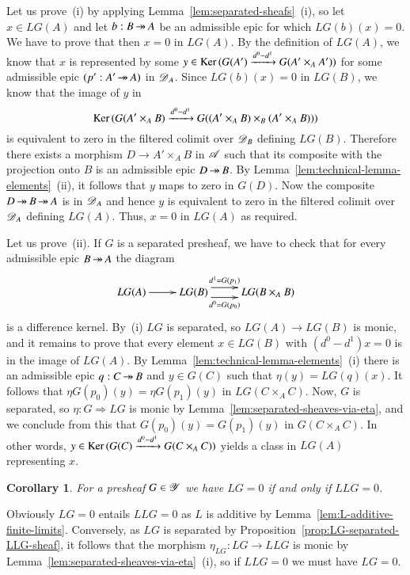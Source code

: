 \documentclass[1p]{elsarticle}
\makeatletter
\renewenvironment{proof}[1][\proofname]{\par
  \pushQED{\qed}%
  \normalfont \topsep6\p@\@plus6\p@\relax
  \trivlist
  \item[\hskip\labelsep
        \scshape
    #1\@addpunct{.}]\ignorespaces
}{%
  \popQED\endtrivlist\@endpefalse
}
\theoremstyle{mythm}
\newtheorem{Cor}[Thm]{Corollary}
\theoremstyle{mydef}
\makeatother
\begin{document}
\begin{proof}
  Let us prove~(i) by applying
  Lemma~\ref{lem:separated-sheafs}~(i), so
  let $x \in LG(A)$ and let $b:B \operatorname{\twoheadrightarrow} A$ be an admissible
  epic for which $LG(b)(x) = 0$. We have to prove that then $x = 0$
  in $LG(A)$. By the definition of $LG(A)$, we know that $x$ is
  represented by some
  $y \in \operatorname{Ker}{(G(A') \xrightarrow{d^{0} - d^{1}} G(A'\times_{A} A'))}$ 
  for some admissible epic $(p':A' \operatorname{\twoheadrightarrow} A)$ in $\operatorname{\mathscr{D}}_{A}$.
  Since $LG(b)(x) = 0$ in $LG(B)$, we know that the image of $y$ 
  in 
  \[
  \operatorname{Ker}{(G(A' \times_{A} B) \xrightarrow{d^{0} - d^{1}} G((A'
    \times_{A} B) \times_{B} (A' \times_{A} B)))}
  \]
  is equivalent to zero in the filtered colimit over $\operatorname{\mathscr{D}}_{B}$
  defining $LG(B)$. Therefore there exists a morphism 
  $D \to A' \times_{A} B$ in $\operatorname{\mathscr{A}}$ such that its composite with the
  projection onto $B$ is an admissible epic $D \operatorname{\twoheadrightarrow} B$. By
  Lemma~\ref{lem:technical-lemma-elements}~(ii), it follows that $y$
  maps to zero in $G(D)$. Now the composite $D \operatorname{\twoheadrightarrow} B \operatorname{\twoheadrightarrow} A$ is in
  $\operatorname{\mathscr{D}}_{A}$ and hence $y$ is equivalent to zero in the filtered colimit
  over $\operatorname{\mathscr{D}}_{A}$ defining $LG(A)$. Thus, $x = 0$ in $LG(A)$ as
  required.

  Let us prove~(ii). 
  If $G$ is a separated presheaf, we have to check
  that for every admissible epic $B \operatorname{\twoheadrightarrow} A$ the diagram
  \[
  \xymatrix{
    LG(A) \ar[r] &
    LG(B) \ar@<-1ex>[r]_>>>>>{d^{0} = G(p_{0})}
        \ar@<1ex>[r]^>>>>>{d^{1} = G(p_{1})} &
    LG(B \times_{A} B)
  }
  \]
  is a difference kernel. By~(i) $LG$ is separated, so
  $LG(A) \to LG(B)$ is monic, and it remains to prove that
  every element $x \in LG(B)$ with $(d^{0} - d^{1})x = 0$ is in the
  image of $LG(A)$. By Lemma~\ref{lem:technical-lemma-elements}~(i)
  there is an admissible epic $q:C \operatorname{\twoheadrightarrow} B$ and $y \in G(C)$ such
  that $\eta(y) = LG(q)(x)$. It follows that
  $\eta G(p_{0}) (y) = \eta G(p_{1})(y)$ in $LG(C \times_{A} C)$. Now,
  $G$ is separated, so $\eta: G \Rightarrow LG$ is
  monic by Lemma~\ref{lem:separated-sheaves-via-eta},
  and we conclude from this that
  $G(p_{0})(y) = G(p_{1})(y)$ in $G(C \times_{A} C)$. In
  other words,
  $y \in \operatorname{Ker}{(G(C) \xrightarrow{d^{0} - d^{1}} G(C \times_{A} C))}$
  yields a class in $LG(A)$ representing $x$.
\end{proof}

\begin{Cor}
  \label{cor:LG=0-iff-LLG=0}
  For a presheaf $G \in \operatorname{\mathscr{Y}}$ we have $LG = 0$ if and only if
  $LLG = 0$.
\end{Cor}
\begin{proof}
  Obviously $LG = 0$ entails $LLG = 0$ as $L$ is additive by 
  Lemma~\ref{lem:L-additive-finite-limits}. Conversely,
  as $LG$ is separated by
  Proposition~\ref{prop:LG-separated-LLG-sheaf}, it follows that
  the morphism $\eta_{LG}: LG \to LLG$ is monic by
  Lemma~\ref{lem:separated-sheaves-via-eta}~(i), so if $LLG = 0$ we
  must have $LG = 0$.
\end{proof}
\end{document}
